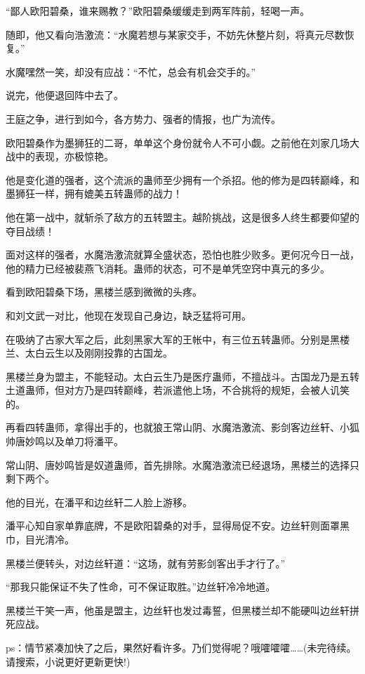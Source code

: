 \begin{this_body}
“鄙人欧阳碧桑，谁来赐教？”欧阳碧桑缓缓走到两军阵前，轻喝一声。

随即，他又看向浩激流：“水魔若想与某家交手，不妨先休整片刻，将真元尽数恢复。”

水魔嘿然一笑，却没有应战：“不忙，总会有机会交手的。”

说完，他便退回阵中去了。

王庭之争，进行到如今，各方势力、强者的情报，也广为流传。

欧阳碧桑作为墨狮狂的二哥，单单这个身份就令人不可小觑。之前他在刘家几场大战中的表现，亦极惊艳。

他是变化道的强者，这个流派的蛊师至少拥有一个杀招。他的修为是四转巅峰，和墨狮狂一样，拥有媲美五转蛊师的战力！

他在第一战中，就斩杀了敌方的五转盟主。越阶挑战，这是很多人终生都要仰望的夺目战绩！

面对这样的强者，水魔浩激流就算全盛状态，恐怕也胜少败多。更何况今日一战，他的精力已经被裴燕飞消耗。蛊师的状态，可不是单凭空窍中真元的多少。

看到欧阳碧桑下场，黑楼兰感到微微的头疼。

和刘文武一对比，他现在发现自己身边，缺乏猛将可用。

在吸纳了古家大军之后，此刻黑家大军的王帐中，有三位五转蛊师。分别是黑楼兰、太白云生以及刚刚投靠的古国龙。

黑楼兰身为盟主，不能轻动。太白云生乃是医疗蛊师，不擅战斗。古国龙乃是五转土道蛊师，但对方乃是四转巅峰，若派遣他上场，不合挑将的规矩，会被人讥笑的。

再看四转蛊师，拿得出手的，也就狼王常山阴、水魔浩激流、影剑客边丝轩、小狐帅唐妙鸣以及单刀将潘平。

常山阴、唐妙鸣皆是奴道蛊师，首先排除。水魔浩激流已经退场，黑楼兰的选择只剩下两个。

他的目光，在潘平和边丝轩二人脸上游移。

潘平心知自家单靠底牌，不是欧阳碧桑的对手，显得局促不安。边丝轩则面罩黑巾，目光清冷。

黑楼兰便转头，对边丝轩道：“这场，就有劳影剑客出手才行了。”

“那我只能保证不失了性命，可不保证取胜。”边丝轩冷冷地道。

黑楼兰干笑一声，他虽是盟主，边丝轩也发过毒誓，但黑楼兰却不能硬叫边丝轩拼死应战。

ps：情节紧凑加快了之后，果然好看许多。乃们觉得呢？哦嚯嚯嚯……(未完待续。请搜索，小说更好更新更快!)

\end{this_body}

